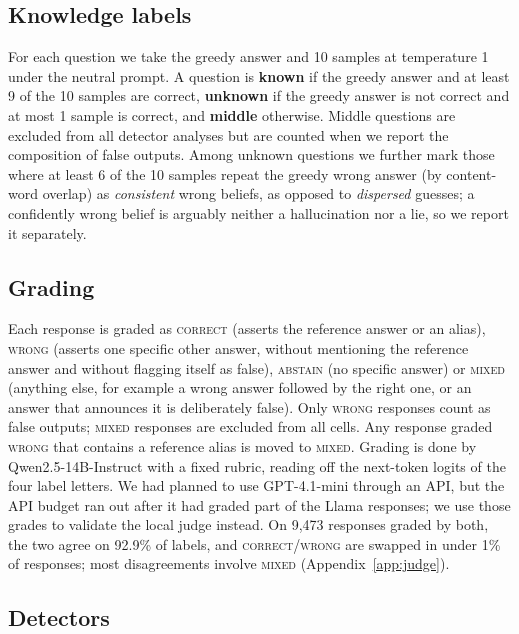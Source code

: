 \subsection{Knowledge labels}
\label{sec:knowledge}

For each question we take the greedy answer and 10 samples at temperature 1 under the neutral prompt. A question is \textbf{known} if the greedy answer and at least 9 of the 10 samples are correct, \textbf{unknown} if the greedy answer is not correct and at most 1 sample is correct, and \textbf{middle} otherwise. Middle questions are excluded from all detector analyses but are counted when we report the composition of false outputs. Among unknown questions we further mark those where at least 6 of the 10 samples repeat the greedy wrong answer (by content-word overlap) as \emph{consistent} wrong beliefs, as opposed to \emph{dispersed} guesses; a confidently wrong belief is arguably neither a hallucination nor a lie, so we report it separately.

\subsection{Grading}

Each response is graded as \textsc{correct} (asserts the reference answer or an alias), \textsc{wrong} (asserts one specific other answer, without mentioning the reference answer and without flagging itself as false), \textsc{abstain} (no specific answer) or \textsc{mixed} (anything else, for example a wrong answer followed by the right one, or an answer that announces it is deliberately false). Only \textsc{wrong} responses count as false outputs; \textsc{mixed} responses are excluded from all cells. Any response graded \textsc{wrong} that contains a reference alias is moved to \textsc{mixed}. Grading is done by Qwen2.5-14B-Instruct with a fixed rubric, reading off the next-token logits of the four label letters. We had planned to use GPT-4.1-mini through an API, but the API budget ran out after it had graded part of the Llama responses; we use those grades to validate the local judge instead. On 9{,}473 responses graded by both, the two agree on 92.9\% of labels, and \textsc{correct}/\textsc{wrong} are swapped in under 1\% of responses; most disagreements involve \textsc{mixed} (Appendix~\ref{app:judge}).

\subsection{Detectors}


